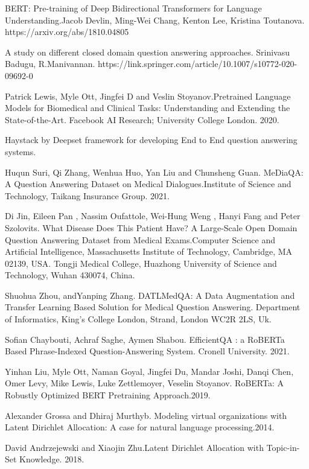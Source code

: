 \documentclass[runningheads]{llncs}
\begin{document}
\begin{thebibliography}{8}

 BERT: Pre-training of Deep Bidirectional Transformers for Language Understanding.Jacob Devlin, Ming-Wei Chang, Kenton Lee, Kristina Toutanova. https://arxiv.org/abs/1810.04805


 A study on different closed domain question answering approaches. Srinivasu Badugu, R.Manivannan. https://link.springer.com/article/10.1007/s10772-020-09692-0

 Patrick Lewis, Myle Ott, Jingfei D and Veslin Stoyanov.Pretrained Language Models for Biomedical and Clinical Tasks:
Understanding and Extending the State-of-the-Art. Facebook AI Research; University College London. 2020.

 Haystack by Deepset framework for developing End to End question answering systems.

Huqun Suri, Qi Zhang, Wenhua Huo, Yan Liu and Chunsheng Guan. MeDiaQA: A Question Answering Dataset on
Medical Dialogues.Institute of Science and Technology, Taikang Insurance Group. 2021.

Di Jin, Eileen Pan , Nassim Oufattole, Wei-Hung Weng , Hanyi Fang and Peter Szolovits. What Disease Does This Patient Have? A Large-Scale Open Domain Question Answering Dataset from Medical Exams.Computer Science and Artificial Intelligence, Massachusetts Institute of Technology, Cambridge, MA 02139, USA. Tongji Medical College, Huazhong University of Science and Technology, Wuhan 430074, China.


 Shuohua Zhou, andYanping Zhang. DATLMedQA: A Data Augmentation and Transfer Learning Based Solution for Medical
Question Answering. Department of Informatics, King’s College London, Strand, London WC2R 2LS, Uk.


Sofian Chaybouti, Achraf Saghe, Aymen Shabou. EfficientQA : a RoBERTa Based Phrase-Indexed Question-Answering System. Cronell University. 2021.

Yinhan Liu, Myle Ott, Naman Goyal, Jingfei Du, Mandar Joshi, Danqi Chen, Omer Levy, Mike Lewis, Luke Zettlemoyer, Veselin Stoyanov. RoBERTa: A Robustly Optimized BERT Pretraining Approach.2019.


 Alexander Grossa and Dhiraj Murthyb. Modeling virtual organizations with Latent Dirichlet Allocation: A case for natural language processing.2014. 


David Andrzejewski and Xiaojin Zhu.Latent Dirichlet Allocation with Topic-in-Set Knowledge. 2018. 


\end{thebibliography}
\end{document}
